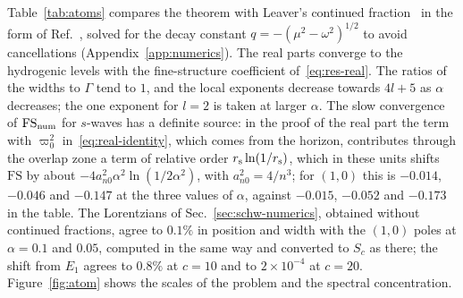 \documentclass[%
 aip,
 jmp,
 amsmath,amssymb,
 reprint, onecolumn
]{revtex4-1}
\theoremstyle{definition}
\theoremstyle{remark}
\begin{document}
Table~\ref{tab:atoms} compares the theorem with Leaver's continued
fraction~\cite{Leaver1985} in the form of Ref.~,
solved for the decay constant $q=-(\mu^2-\omega^2)^{1/2}$ to avoid
cancellations (Appendix~\ref{app:numerics}). The real parts converge to
the hydrogenic levels with the fine-structure coefficient
of~\eqref{eq:res-real}. The ratios of the widths to $\Gamma$ tend to $1$,
and the local exponents decrease towards $4l+5$ as $\alpha$ decreases;
the one exponent for $l=2$ is taken at larger $\alpha$. The slow convergence of $\mathrm{FS}_{\rm num}$
for $s$-waves has a definite source: in the proof of the real part the
term with $\varpi_0^2$ in~\eqref{eq:real-identity}, which comes from the
horizon, contributes through the overlap zone a term of relative order
$r_{\rm s}\ln(1/r_{\rm s})$,
which in these units shifts $\mathrm{FS}$ by about
$-4a_{n0}^2\alpha^2\ln(1/2\alpha^2)$, with $a_{n0}^2=4/n^3$; for $(1,0)$
this is $-0.014$, $-0.046$ and $-0.147$ at the three values of $\alpha$,
against $-0.015$, $-0.052$ and $-0.173$ in the table. The Lorentzians of
Sec.~\ref{sec:schw-numerics},
obtained without continued fractions, agree to $0.1\%$ in position and
width with the $(1,0)$ poles at $\alpha=0.1$ and $0.05$, computed in the
same way and converted to $S_c$ as there; the shift from $E_1$ agrees to $0.8\%$ at $c=10$
and to $2\times10^{-4}$ at $c=20$. Figure~\ref{fig:atom} shows the scales of the problem and the
spectral concentration.
\end{document}
